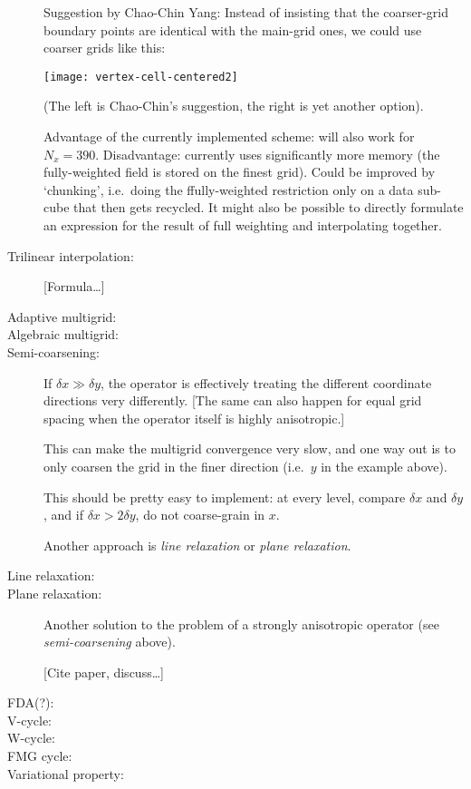\documentclass[\mydriver,12pt,twoside,notitlepage,letterpaper]{article}
\begin{document}
\begin{description}
  \bigskip

  Suggestion by Chao-Chin Yang: Instead of insisting that the coarser-grid
  boundary points are identical with the main-grid ones, we could use
  coarser grids like this:

  \centerline{\texttt{[image: vertex-cell-centered2]}}

  (The left is Chao-Chin's suggestion, the right is yet another option).

  Advantage of the currently implemented scheme: will also work for $N_x =
  390$.
  Disadvantage: currently uses significantly more memory (the
  fully-weighted field is stored on the finest grid).
  Could be improved by `chunking', i.e.~doing the ffully-weighted
  restriction only on a data sub-cube that then gets recycled.
  It might also be possible to directly formulate an expression for the
  result of full weighting and interpolating together.

\item[Trilinear interpolation:]
  [Formula\ldots]

\item[Adaptive multigrid:]

\item[Algebraic multigrid:]

\item[Semi-coarsening:]
  If $\delta x \gg \delta y$, the operator is effectively treating the
  different coordinate directions very differently.
  [The same can also happen for equal grid spacing when the operator
  itself is highly anisotropic.]

  This can make the multigrid convergence very slow, and one way out is to
  only coarsen the grid in the finer direction (i.e.~$y$ in the example
  above).

  This should be pretty easy to implement: at every level, compare $\delta
  x$ and $\delta y$, and if $\delta x > 2\delta y$, do not coarse-grain in
  $x$.

  Another approach is \emph{line relaxation} or \emph{plane relaxation}.
  
\item[Line relaxation:]
\item[Plane relaxation:]
  Another solution to the problem of a strongly anisotropic operator (see
  \emph{semi-coarsening} above).

  [Cite paper, discuss\ldots]

\item[FDA(?):]
\item[V-cycle:]
\item[W-cycle:]
\item[FMG cycle:]
\item[Variational property:]
\end{description}
\end{document}
